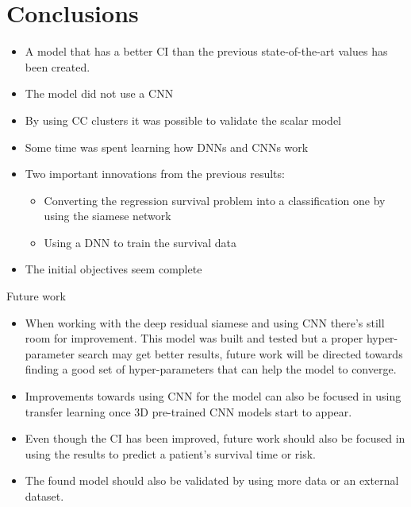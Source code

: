 
\section{Conclusions}

\begin{frame}
  \begin{itemize}
    \item A model that has a better CI than the previous state-of-the-art values has been created.
    \item The model did not use a CNN
    \item By using CC clusters it was possible to validate the scalar model
    \item Some time was spent learning how DNNs and CNNs work
    \item Two important innovations from the previous results:
    \begin{itemize}
      \item Converting the regression survival problem into a classification one by using 
      the siamese network
      \item Using a DNN to train the survival data
    \end{itemize}
    \item The initial objectives seem complete
  \end{itemize}
\end{frame}

\begin{frame}{Future work}
  \begin{itemize}
    \item When working with the deep residual siamese and using CNN there's still 
    room for improvement. This model was built and tested but a proper 
    hyper-parameter search may get better results, future work will be directed towards
    finding a good set of hyper-parameters that can help the model to converge.
    \item Improvements towards using CNN for the model can also be focused in 
    using transfer learning once 3D pre-trained CNN models start to appear.
    \item Even though the CI has been improved, future work should also be focused in 
    using the results to predict a patient's survival time or risk.
    \item The found model should also be validated by using more data or an external dataset.
  \end{itemize}
\end{frame}
